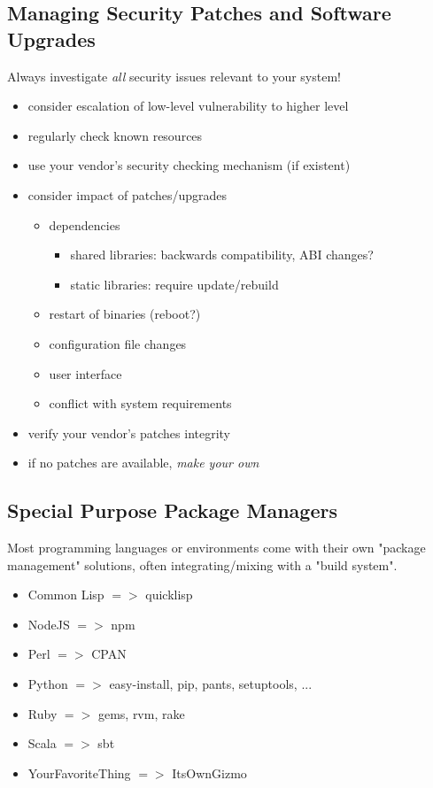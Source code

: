 \documentclass[xga]{xdvislides}
\begin{document}
\subsection{Managing Security Patches and Software Upgrades}
Always investigate {\em all} security issues relevant to your system!
\begin{itemize}
	\item consider escalation of low-level vulnerability to higher level
	\item regularly check known resources
	\item use your vendor's security checking mechanism (if existent)
	\item consider impact of patches/upgrades
		\begin{itemize}
			\item dependencies
				\begin{itemize}
					\item shared libraries:  backwards compatibility, ABI
						changes?
					\item static libraries:  require update/rebuild
				\end{itemize}
			\item restart of binaries (reboot?)
			\item configuration file changes
			\item user interface
			\item conflict with system requirements
		\end{itemize}
	\item verify your vendor's patches integrity
	\item if no patches are available, {\em make your own}
\end{itemize}

\subsection{Special Purpose Package Managers}
Most programming languages or environments come with their own "package
management" solutions, often integrating/mixing with a "build system".
\begin{itemize}
	\item Common Lisp $=>$ quicklisp
	\item NodeJS $=>$ npm
	\item Perl $=>$ CPAN
	\item Python $=>$ easy-install, pip, pants, setuptools, ...
	\item Ruby $=>$ gems, rvm, rake
	\item Scala $=>$ sbt
	\item YourFavoriteThing $=>$ ItsOwnGizmo
\end{itemize}
\end{document}
